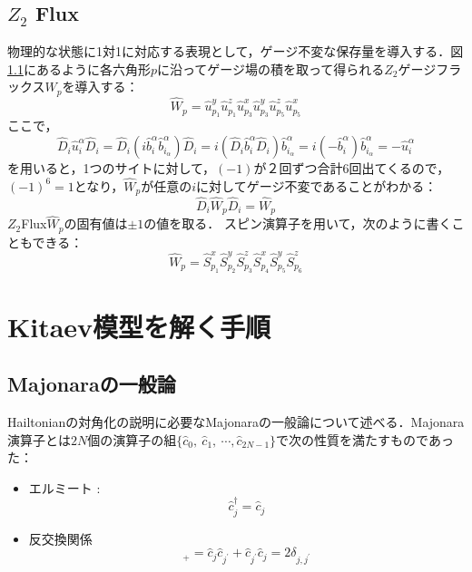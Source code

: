 \documentclass[dvipdfmx,autodetect-engine]{jsarticle}
\begin{document}
\subsection{$Z_2$ Flux}
物理的な状態に1対1に対応する表現として，ゲージ不変な保存量を導入する．図\ref{}にあるように各六角形$p$に沿ってゲージ場の積を取って得られる$Z_2$ゲージフラックス$W_p$を導入する：
\begin{equation}
    \hat{W}_{p}=\hat{u}_{p_1}^{y}\hat{u}_{p_1}^{z}\hat{u}_{p_3}^{x}
    \hat{u}_{p_3}^{y}\hat{u}_{p_5}^{z}\hat{u}_{p_5}^{x}
\end{equation}
ここで，
\begin{equation}
    \hat{D}_{i}\hat{u}_{i}^{\alpha}\hat{D}_i
    =\hat{D}_i(i\hat{b}_i^{\alpha}\hat{b}_{i_\alpha}^{\alpha})\hat{D}_{i}
    =i(\hat{D}_i\hat{b}_i^{\alpha}\hat{D}_{i})\hat{b}_{i_\alpha}^{\alpha}
    =i(-\hat{b}_i^{\alpha})\hat{b}_{i_\alpha}^{\alpha}
    =-\hat{u}_{i}^{\alpha}
\end{equation}
を用いると，1つのサイトに対して，$(-1)$が２回ずつ合計6回出てくるので，$(-1)^6=1$となり，$\hat{W}_p$が任意の$i$に対してゲージ不変であることがわかる：
\begin{equation}
    \hat{D}_{i}\hat{W}_p\hat{D}_i = \hat{W}_p
\end{equation}
$Z_2$Flux$\hat{W}_p$の固有値は$\pm1$の値を取る．
スピン演算子を用いて，次のように書くこともできる：
\begin{equation}
    \hat{W}_{p}=\hat{S}_{p_1}^{x}\hat{S}_{p_2}^{y}\hat{S}_{p_3}^{z}
    \hat{S}_{p_4}^{x}\hat{S}_{p_5}^{y}\hat{S}_{p_6}^{z}
\end{equation}


\section{Kitaev模型を解く手順}



\subsection{Majonaraの一般論}
Hailtonianの対角化の説明に必要なMajonaraの一般論について述べる．Majonara演算子とは$2N$個の演算子の組$\{\hat{c}_0,\ \hat{c}_1,\ \cdots, \hat{c}_{2N-1}\}$で次の性質を満たすものであった：
\begin{itemize}
      \item エルミート : 
      \begin{equation}
          \hat{c}_j^{\dag} = \hat{c}_j
      \end{equation}
      \item 反交換関係
      \begin{equation}
          [\hat{c}_j,\ \hat{c}_{j^\prime}]_{+}=
          \hat{c}_j\hat{c}_{j^\prime}
          +\hat{c}_{j^\prime}\hat{c}_{j}=2\delta_{j,j^{\prime}}
      \end{equation}
\end{itemize}
\end{document}
